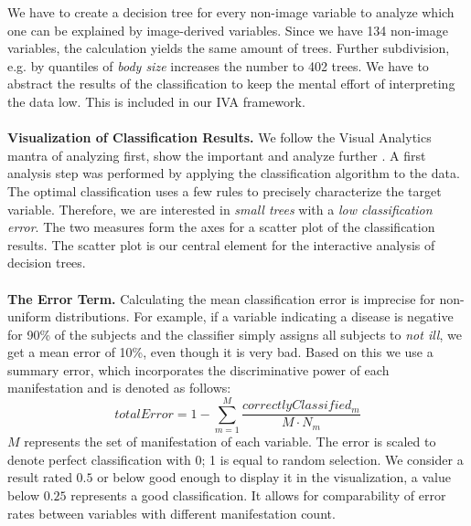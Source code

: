 \documentclass[a4paper,twoside]{style/article}
\begin{document}
We have to create a decision tree for every non-image variable to analyze which one can be explained by image-derived variables.
Since we have 134 non-image variables, the calculation yields the same amount of trees.
Further subdivision, e.g. by quantiles of \emph{body size} increases the number to 402 trees.
We have to abstract the results of the classification to keep the mental effort of interpreting the data low.
This is included in our IVA framework.
\\\\
\noindent \textbf{Visualization of Classification Results.}
We follow the Visual Analytics mantra of analyzing first, show the important and analyze further \cite{Keim}.
A first analysis step was performed by applying the classification algorithm to the data.
The optimal classification uses a few rules to precisely characterize the target variable.
Therefore, we are interested in \emph{small trees} with a \emph{low classification error}.
The two measures form the axes for a scatter plot of the classification results.
The scatter plot is our central element for the interactive analysis of decision trees.
\\\\
\noindent \textbf{The Error Term.}
Calculating the mean classification error is imprecise for non-uniform distributions.
For example, if a variable indicating a disease is negative for 90\% of the subjects and the classifier simply assigns all subjects to \emph{not ill}, we get a mean error of 10\%, even though it is very bad.
Based on this we use a summary error, which incorporates the discriminative power of each manifestation and is denoted as follows:
\begin{equation}
totalError = 1 - \sum_{m=1}^M \frac{correctlyClassified_{m}}{M\cdot N_m}
\end{equation}
$M$ represents the set of manifestation of each variable.
The error is scaled to denote perfect classification with 0; 1 is equal to random selection.
We consider a result rated $0.5$ or below good enough to display it in the visualization, a value below $0.25$ represents a good classification.
It allows for comparability of error rates between variables with different manifestation count.
\end{document}

